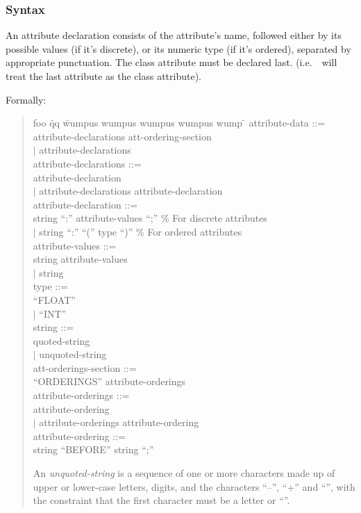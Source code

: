 \subsubsection{Syntax}
\label{att_syntax}
An attribute declaration consists of the attribute's name, followed
either by its possible values (if it's discrete), or its numeric
type (if it's ordered), separated by appropriate punctuation.
The class attribute must be declared last.  (i.e.\ \CN\ will
treat the last attribute as the class attribute).

Formally:
\begin{quotation} \sf
\begin{tabbing} 
foo \= qq \= wumpus wumpus wumpus wumpus wump \= \kill
attribute-data ::= \\
\>\> attribute-declarations \gap att-ordering-section\\
\> $\mid$ \> attribute-declarations \\[2.5ex]
attribute-declarations ::= \\
\>\>attribute-declaration \\
\> $\mid$ \> attribute-declarations \gap attribute-declaration \\[2.5ex]
attribute-declaration ::= \\
\>\>        string ``:'' attribute-values ``;'' \>   \rm \% For discrete attributes \\
\>$\mid$ \> string ``:'' ``('' type ``)''      \> 
                           \rm \% For ordered attributes \\[2.5ex]
attribute-values ::=  \\
\>\>      string \gap attribute-values  \\
\>  $\mid$  \> string  \\[2.5ex]
type ::= \\
\>\>   ``FLOAT''   \\
\> $\mid$ \> ``INT'' \\[2.5ex]
string ::=  \\
\>\>  quoted-string   \\
\>$\mid$ \> unquoted-string  \\
att-orderings-section ::= \\
\>\> ``ORDERINGS'' attribute-orderings\\[2.5ex]
attribute-orderings ::= \\
\>\> attribute-ordering \\
\>  $\mid$  \> attribute-orderings attribute-ordering \\[2.5ex]
attribute-ordering ::= \\
\>\> string ``BEFORE'' string ``;'' \\
\end{tabbing}
\rm
An {\it unquoted-string} is a sequence of one or more characters made
up of upper
or lower-case letters, digits, and the characters ``--'', ``+'' and ``\und'',
with the constraint that the first character must be a letter or ``\und''.


\end{quotation}
